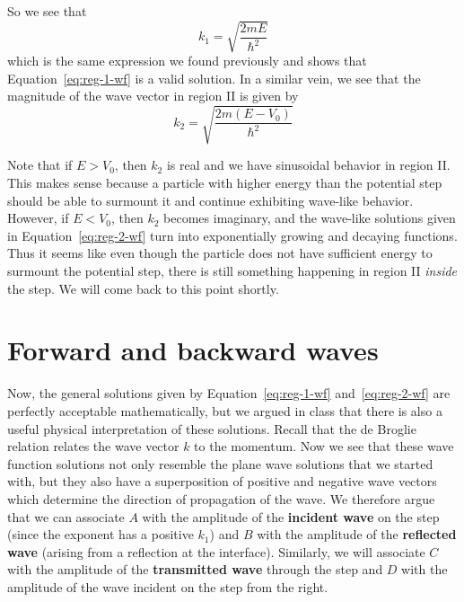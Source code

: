 So we see that
\begin{equation}
	k_1 = \sqrt{\frac{2mE}{\hbar^2}} \label{eq:reg-1-k}
\end{equation}
which is the same expression we found previously and shows that Equation~\ref{eq:reg-1-wf} is a valid solution. In a similar vein, we see that the magnitude of the wave vector in region II is given by 
\begin{equation}
	k_2 = \sqrt{\frac{2m(E-V_0)}{\hbar^2}} \label{eq:reg-2-k}
\end{equation}

Note that if $E > V_0$, then $k_2$ is real and we have sinusoidal behavior in region II. This makes sense because a particle with higher energy than the potential step should be able to surmount it and continue exhibiting wave-like behavior. However, if $E < V_0$, then $k_2$ becomes imaginary, and the wave-like solutions given in Equation~\ref{eq:reg-2-wf} turn into exponentially growing and decaying functions. Thus it seems like even though the particle does not have sufficient energy to surmount the potential step, there is still something happening in region II \emph{inside} the step. We will come back to this point shortly. \par 


\section{Forward and backward waves}
Now, the general solutions given by Equation~\ref{eq:reg-1-wf} and~\ref{eq:reg-2-wf} are perfectly acceptable mathematically, but we argued in class that there is also a useful physical interpretation of these solutions. Recall that the de Broglie relation relates the wave vector $k$ to the momentum. Now we see that these wave function solutions not only resemble the plane wave solutions that we started with, but they also have a superposition of positive and negative wave vectors which determine the direction of propagation of the wave. We therefore argue that we can associate $A$ with the amplitude of the \textbf{incident wave} on the step (since the exponent has a positive $k_1$) and $B$ with the amplitude of the \textbf{reflected wave} (arising from a reflection at the interface). Similarly, we will associate $C$ with the amplitude of the \textbf{transmitted wave} through the step and $D$ with the amplitude of the wave incident on the step from the right. \par 

